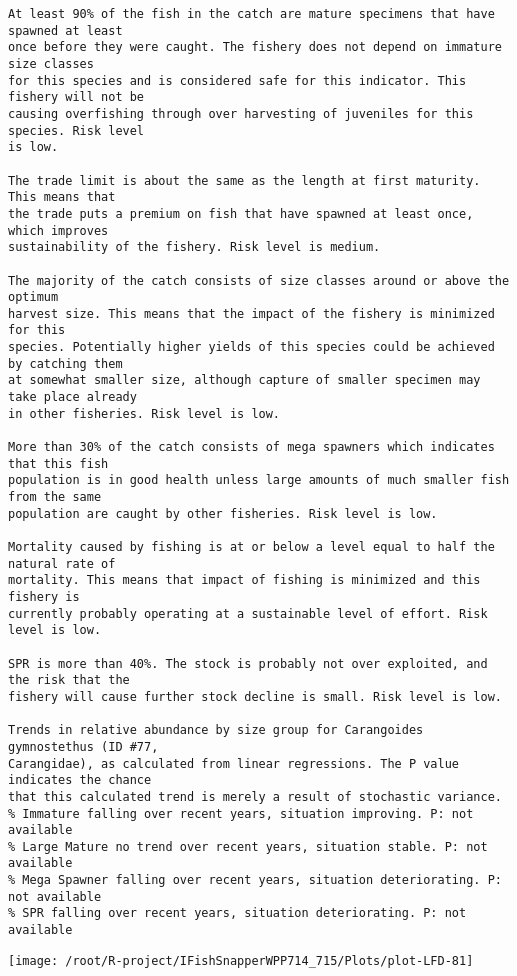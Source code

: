 \documentclass{report}\usepackage[]{graphicx}\usepackage[]{color}
\makeatletter
\def\maxwidth{ %
  \ifdim\Gin@nat@width>\linewidth
    \linewidth
  \else
    \Gin@nat@width
  \fi
}
\newenvironment{kframe}{%
 \def\at@end@of@kframe{}%
 \ifinner\ifhmode%
  \def\at@end@of@kframe{\end{minipage}}%
  \begin{minipage}{\columnwidth}%
 \fi\fi%
 \def\FrameCommand##1{\hskip\@totalleftmargin \hskip-\fboxsep
 \colorbox{shadecolor}{##1}\hskip-\fboxsep
     \hskip-\linewidth \hskip-\@totalleftmargin \hskip\columnwidth}%
 \MakeFramed {\advance\hsize-\width
   \@totalleftmargin\z@ \linewidth\hsize
   \@setminipage}}%
 {\par\unskip\endMakeFramed%
 \at@end@of@kframe}
\newenvironment{knitrout}{}{} %
\makeatother
\begin{document}
\begin{knitrout}
\begin{kframe}
\begin{verbatim}
At least 90% of the fish in the catch are mature specimens that have spawned at least
once before they were caught. The fishery does not depend on immature size classes
for this species and is considered safe for this indicator. This fishery will not be
causing overfishing through over harvesting of juveniles for this species. Risk level
is low.

The trade limit is about the same as the length at first maturity.  This means that
the trade puts a premium on fish that have spawned at least once, which improves
sustainability of the fishery. Risk level is medium.

The majority of the catch consists of size classes around or above the optimum
harvest size. This means that the impact of the fishery is minimized for this
species. Potentially higher yields of this species could be achieved by catching them
at somewhat smaller size, although capture of smaller specimen may take place already
in other fisheries. Risk level is low.

More than 30% of the catch consists of mega spawners which indicates that this fish
population is in good health unless large amounts of much smaller fish from the same
population are caught by other fisheries. Risk level is low.
 
Mortality caused by fishing is at or below a level equal to half the natural rate of
mortality. This means that impact of fishing is minimized and this fishery is
currently probably operating at a sustainable level of effort. Risk level is low.
 
SPR is more than 40%. The stock is probably not over exploited, and the risk that the
fishery will cause further stock decline is small. Risk level is low.
 
Trends in relative abundance by size group for Carangoides gymnostethus (ID #77,
Carangidae), as calculated from linear regressions. The P value indicates the chance
that this calculated trend is merely a result of stochastic variance.
% Immature falling over recent years, situation improving. P: not available
% Large Mature no trend over recent years, situation stable. P: not available
% Mega Spawner falling over recent years, situation deteriorating. P: not available
% SPR falling over recent years, situation deteriorating. P: not available
\end{verbatim}
\end{kframe}
\texttt{[image: /root/R-project/IFishSnapperWPP714\_715/Plots/plot-LFD-81]} 


\end{knitrout}
\end{document}
